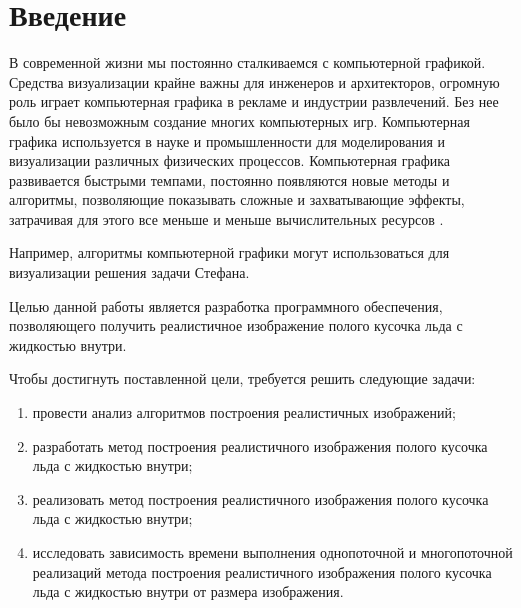 \chapter*{Введение}

В современной жизни мы постоянно сталкиваемся с компьютерной графикой. Средства визуализации крайне важны для инженеров и архитекторов, огромную роль играет компьютерная графика в рекламе и индустрии развлечений. Без нее было бы невозможным создание многих компьютерных игр. Компьютерная графика используется в науке и промышленности для моделирования и визуализации различных физических процессов. Компьютерная графика развивается быстрыми темпами, постоянно появляются новые методы и алгоритмы, позволяющие показывать сложные и захватывающие эффекты, затрачивая для этого все меньше и меньше вычислительных ресурсов \cite{boreskov}.

 Например, алгоритмы компьютерной графики могут использоваться для визуализации решения задачи Стефана.

Целью данной работы является разработка программного обеспечения, позволяющего получить реалистичное изображение полого кусочка льда с жидкостью внутри.

Чтобы достигнуть поставленной цели, требуется решить следующие задачи:
\begin{enumerate}[label=\arabic*)]
    \item провести анализ алгоритмов построения реалистичных изображений;
    \item разработать метод построения реалистичного изображения полого кусочка льда с жидкостью внутри;
    \item реализовать метод построения реалистичного изображения полого кусочка льда с жидкостью внутри;
    \item исследовать зависимость времени выполнения однопоточной и многопоточной реализаций метода построения реалистичного изображения полого кусочка льда с жидкостью внутри от размера изображения.
\end{enumerate}
